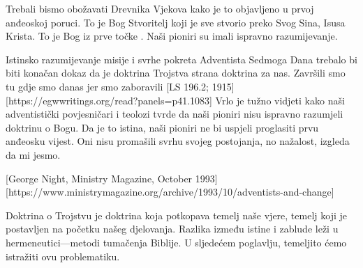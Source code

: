 Trebali bismo obožavati Drevnika Vjekova kako je to objavljeno u prvoj anđeoskoj poruci. To je Bog Stvoritelj koji je sve stvorio preko Svog Sina, Isusa Krista. To je Bog iz prve točke . Naši pioniri su imali ispravno razumijevanje.

Istinsko razumijevanje misije i svrhe pokreta Adventista Sedmoga Dana trebalo bi biti konačan dokaz da je doktrina Trojstva strana doktrina za nas. Završili smo tu gdje smo danas jer smo zaboravili [LS 196.2; 1915][https://egwwritings.org/read?panels=p41.1083] Vrlo je tužno vidjeti kako naši adventistički povjesničari i teolozi tvrde da naši pioniri nisu ispravno razumjeli doktrinu o Bogu. Da je to istina, naši pioniri ne bi uspjeli proglasiti prvu anđeosku vijest. Oni nisu promašili svrhu svojeg postojanja, no nažalost, izgleda da mi jesmo.

[George Night, Ministry Magazine, October 1993][https://www.ministrymagazine.org/archive/1993/10/adventists-and-change]

Doktrina o Trojstvu je doktrina koja potkopava temelj naše vjere, temelj koji je postavljen na početku našeg djelovanja. Razlika između istine i zablude leži u hermeneutici—metodi tumačenja Biblije. U sljedećem poglavlju, temeljito ćemo istražiti ovu problematiku.

